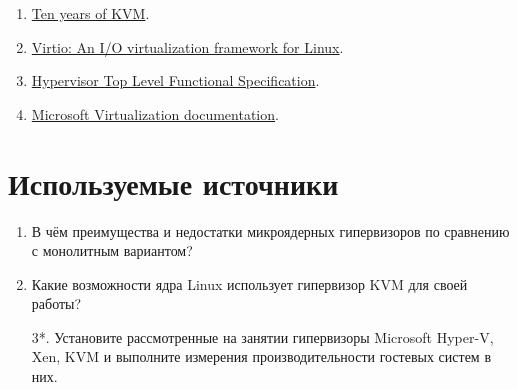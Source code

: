 \documentclass[14pt, a4paper]{article}
\begin{document}
\begin{enumerate}
    \item \href{https://lwn.net/Articles/705160/}{Ten years of KVM}.
    \item \href{https://developer.ibm.com/articles/l-virtio/}{Virtio: An I/O virtualization framework for Linux}.
    \item \href{https://github.com/MicrosoftDocs/Virtualization-Documentation/raw/master/tlfs/Hypervisor%20Top%20Level%20Functional%20Specification%20v5.0C.pdf}{Hypervisor Top Level Functional Specification}.
    \item \href{https://github.com/MicrosoftDocs/Virtualization-Documentation}{Microsoft Virtualization documentation}.
\end{enumerate}

\section*{Используемые источники}

\begin{enumerate}
    \item В чём преимущества и недостатки микроядерных гипервизоров по сравнению с монолитным
    вариантом?
    \item Какие возможности ядра Linux использует гипервизор KVM для своей работы?
    \item[3*.] Установите рассмотренные на занятии гипервизоры Microsoft Hyper-V, Xen, KVM и выполните
    измерения производительности гостевых систем в них.
\end{enumerate}
\end{document}
